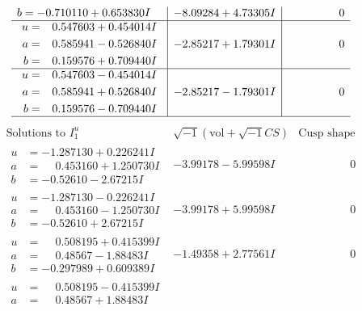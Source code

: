\documentclass[1p]{elsarticle_modified}
\theoremstyle{definition}
\newcommand{\I}{\sqrt{-1}}
\begin{document}
$$\begin{array}{c|c|c}
\begin{aligned}
b &= -0.710110 + 0.653830 I\end{aligned}
 & -8.09284 + 4.73305 I & \phantom{-0.000000 } 0 \\ \hline\begin{aligned}
u &= \phantom{-}0.547603 + 0.454014 I \\
a &= \phantom{-}0.585941 - 0.526840 I \\
b &= \phantom{-}0.159576 + 0.709440 I\end{aligned}
 & -2.85217 + 1.79301 I & \phantom{-0.000000 } 0 \\ \hline\begin{aligned}
u &= \phantom{-}0.547603 - 0.454014 I \\
a &= \phantom{-}0.585941 + 0.526840 I \\
b &= \phantom{-}0.159576 - 0.709440 I\end{aligned}
 & -2.85217 - 1.79301 I & \phantom{-0.000000 } 0\\
 \hline 
 \end{array}$$\newpage$$\begin{array}{c|c|c}  
\text{Solutions to }I^u_{1}& \I (\text{vol} + \sqrt{-1}CS) & \text{Cusp shape}\\
 \hline 
\begin{aligned}
u &= -1.287130 + 0.226241 I \\
a &= \phantom{-}0.453160 + 1.250730 I \\
b &= -0.52610 - 2.67215 I\end{aligned}
 & -3.99178 - 5.99598 I & \phantom{-0.000000 } 0 \\ \hline\begin{aligned}
u &= -1.287130 - 0.226241 I \\
a &= \phantom{-}0.453160 - 1.250730 I \\
b &= -0.52610 + 2.67215 I\end{aligned}
 & -3.99178 + 5.99598 I & \phantom{-0.000000 } 0 \\ \hline\begin{aligned}
u &= \phantom{-}0.508195 + 0.415399 I \\
a &= \phantom{-}0.48567 - 1.88483 I \\
b &= -0.297989 + 0.609389 I\end{aligned}
 & -1.49358 + 2.77561 I & \phantom{-0.000000 } 0 \\ \hline\begin{aligned}
u &= \phantom{-}0.508195 - 0.415399 I \\
a &= \phantom{-}0.48567 + 1.88483 I \\

\end{aligned}
\end{array}$$
\end{document}
